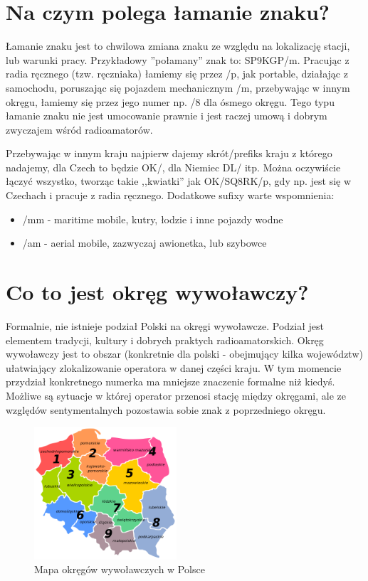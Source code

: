 \documentclass[a4paper,12pt]{article}
\begin{document}
\section{Na czym polega łamanie znaku?}
Łamanie znaku jest to chwilowa zmiana znaku ze względu na lokalizację stacji, lub warunki pracy. Przykładowy ”połamany” znak to: SP9KGP/m. Pracując z radia ręcznego (tzw. ręczniaka) łamiemy się przez /p, jak portable, działając z samochodu, poruszając się pojazdem mechanicznym /m, przebywając w innym okręgu, łamiemy się przez jego numer np. /8 dla ósmego okręgu. Tego typu łamanie znaku nie jest umocowanie prawnie i jest raczej umową i dobrym zwyczajem wśród radioamatorów.

Przebywając w innym kraju najpierw dajemy skrót/prefiks kraju z którego nadajemy, dla Czech to będzie OK/, dla Niemiec DL/ itp. Można oczywiście łączyć wszystko, tworząc takie ,,kwiatki'' jak OK/SQ8RK/p, gdy np. jest się w Czechach i pracuje z radia ręcznego.
Dodatkowe sufixy warte wspomnienia:
\begin{itemize}
\item /mm - maritime mobile, kutry, łodzie i inne pojazdy wodne
\item /am - aerial mobile, zazwyczaj awionetka, lub szybowce\end{itemize}

\section{Co to jest okręg wywoławczy?}
Formalnie, nie istnieje podział Polski na okręgi wywoławcze. Podział jest elementem tradycji, kultury i dobrych praktych radioamatorskich. Okręg wywoławczy jest to obszar (konkretnie dla polski - obejmujący kilka województw) ułatwiający zlokalizowanie operatora w danej części kraju. W tym momencie przydział konkretnego numerka ma mniejsze znaczenie formalne niż kiedyś. Możliwe są sytuacje w której operator przenosi stację między okręgami, ale ze względów sentymentalnych pozostawia sobie znak z poprzedniego okręgu. 
\begin{figure}[h]
 \centering
 \includegraphics[width=150pt]{./Polish_HAM_Radio_Regions.png}
 \caption{Mapa okręgów wywoławczych w Polsce}
\end{figure}
\end{document}
